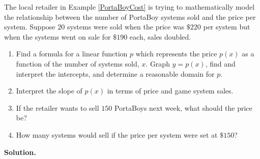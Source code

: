  
 \begin{ex} \label{PortaBoyDemand}  The local retailer in Example \ref{PortaBoyCost} is trying to mathematically model the relationship between the number of PortaBoy systems sold  and the price per system.  Suppose $20$ systems were sold when the price was  $\$220$ per system but when the systems went on sale for  $\$190$ each, sales doubled.
\begin{enumerate}

\item Find a formula for a linear function $p$ which represents the price $p(x)$ as a function of the number of systems sold, $x$. Graph $y = p(x)$, find and interpret the intercepts, and determine a reasonable domain for $p$.

\item Interpret the slope of $p(x)$ in terms of price and game system sales.

\item  If the retailer wants to sell $150$ PortaBoys next week, what should the price be?

\item How many systems would sell if the price per system were set at $\$150$?

\end{enumerate}

\smallskip

{\bf Solution.}  

\begin{enumerate}


\end{enumerate}
\end{ex}
